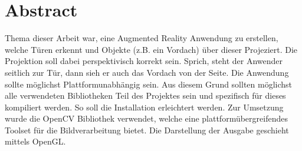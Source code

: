 \chapter*{Abstract}
Thema dieser Arbeit war, eine Augmented Reality Anwendung zu erstellen, welche Türen erkennt und Objekte (z.B. ein Vordach) über dieser Projeziert. Die Projektion soll dabei perspektivisch korrekt sein. Sprich, steht der Anwender seitlich zur Tür, dann sieh er auch das Vordach von der Seite. Die Anwendung sollte möglichst Plattformunabhängig sein. Aus diesem Grund sollten möglichst alle verwendeten Bibliotheken Teil des Projektes sein und spezifisch für dieses kompiliert werden. So soll die Installation erleichtert werden. Zur Umsetzung wurde die OpenCV Bibliothek verwendet, welche eine plattformübergreifendes Toolset für die Bildverarbeitung bietet. Die Darstellung der Ausgabe geschieht mittels OpenGL.